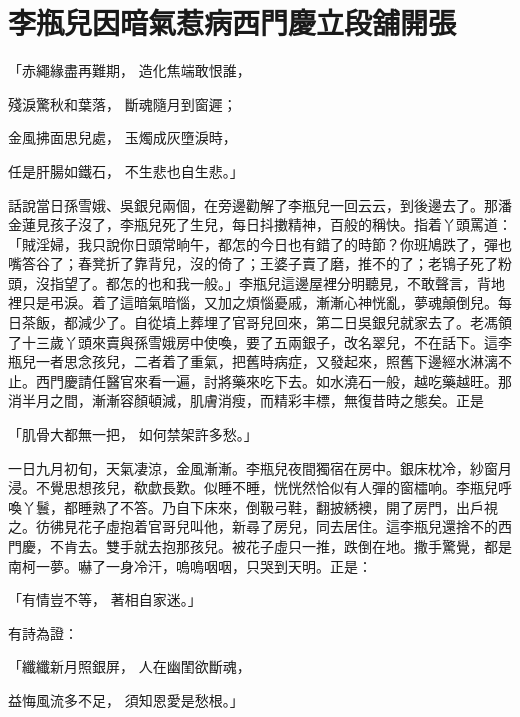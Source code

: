 %

\chapter{李瓶兒因暗氣惹病\KG 西門慶立段舖開張}


\begin{showcontents}{}




「赤繩緣盡再難期，  造化焦端敢恨誰，

殘淚驚秋和葉落，  斷魂隨月到窗遲；

金風拂面思兒處，  玉燭成灰墮淚時，

任是肝腸如鐵石，  不生悲也自生悲。」

話說當日孫雪娥、吳銀兒兩個，在旁邊勸解了李瓶兒一回云云，到後邊去了。那潘金蓮見孩子沒了，李瓶兒死了生兒，每日抖擻精神，百般的稱快。指着丫頭罵道：「賊淫婦，我只說你日頭常晌午，都怎的今日也有錯了的時節？你班鳩跌了，彈也嘴答谷了；春凳折了靠背兒，沒的倚了；王婆子賣了磨，推不的了；老鴇子死了粉頭，沒指望了。都怎的也和我一般。」李瓶兒這邊屋裡分明聽見，不敢聲言，背地裡只是弔淚。着了這暗氣暗惱，又加之煩惱憂戚，漸漸心神恍亂，夢魂顛倒兒。每日茶飯，都減少了。自從墳上葬埋了官哥兒回來，第二日吳銀兒就家去了。老馮領了十三歲丫頭來賣與孫雪娥房中使喚，要了五兩銀子，改名翠兒，不在話下。這李瓶兒一者思念孩兒，二者着了重氣，把舊時病症，又發起來，照舊下邊經水淋漓不止。西門慶請任醫官來看一遍，討將藥來吃下去。如水澆石一般，越吃藥越旺。那消半月之間，漸漸容顏頓減，肌膚消瘦，而精彩丰標，無復昔時之態矣。正是

「肌骨大都無一把，  如何禁架許多愁。」

一日九月初旬，天氣凄涼，金風漸漸。李瓶兒夜間獨宿在房中。銀床枕冷，紗窗月浸。不覺思想孩兒，欷歔長歎。似睡不睡，恍恍然恰似有人彈的窗櫺响。李瓶兒呼喚丫鬟，都睡熟了不答。乃自下床來，倒靸弓鞋，翻披綉襖，開了房門，出戶視之。彷彿見花子虛抱着官哥兒叫他，新尋了房兒，同去居住。這李瓶兒還捨不的西門慶，不肯去。雙手就去抱那孩兒。被花子虛只一推，跌倒在地。撒手驚覺，都是南柯一夢。嚇了一身冷汗，嗚嗚咽咽，只哭到天明。正是：

「有情豈不等，  著相自家迷。」

有詩為證：

「纖纖新月照銀屏，  人在幽閨欲斷魂，

益悔風流多不足，  須知恩愛是愁根。」


\end{showcontents}
